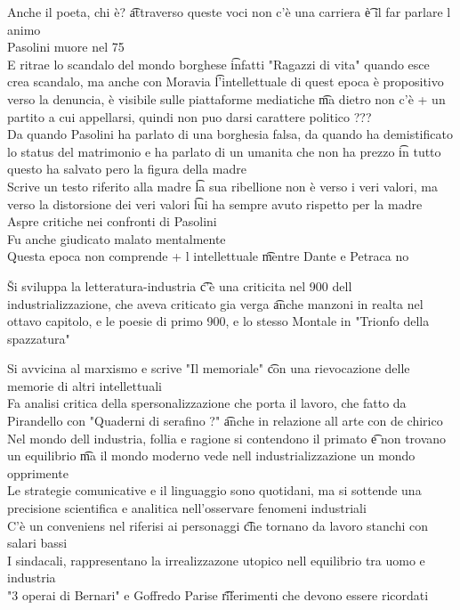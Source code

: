 \documentclass[12pt]{article}
\begin{document}
Anche il poeta, chi è? \t attraverso queste voci non c'è una carriera \t è il far parlare l animo \\
Pasolini muore nel 75 \\
E ritrae lo scandalo del mondo borghese \t infatti "Ragazzi di vita" quando esce crea scandalo, ma anche con Moravia \t l'intellettuale di quest epoca è propositivo verso la denuncia, è visibile sulle piattaforme mediatiche \t ma dietro non c'è + un partito a cui appellarsi, quindi non puo darsi carattere politico ??? \\
Da quando Pasolini ha parlato di una borghesia falsa, da quando ha demistificato lo status del matrimonio e ha parlato di un umanita che non ha prezzo \t in tutto questo ha salvato pero la figura della madre \\
Scrive un testo riferito alla madre \t la sua ribellione non è verso i veri valori, ma verso la distorsione dei veri valori \t lui ha sempre avuto rispetto per la madre \\
Aspre critiche nei confronti di Pasolini \\
Fu anche giudicato malato mentalmente \\
Questa epoca non comprende + l intellettuale \t mentre Dante e Petraca no

\v

Si sviluppa la letteratura-industria \t c'è una criticita nel 900 dell industrializzazione, che aveva criticato gia verga \t anche manzoni in realta nel ottavo capitolo, e le poesie di primo 900, e lo stesso Montale in "Trionfo della spazzatura"

Si avvicina al marxismo e scrive "Il memoriale" \t con una rievocazione delle memorie di altri intellettuali \\
Fa analisi critica della spersonalizzazione che porta il lavoro, che fatto da Pirandello con "Quaderni di serafino ?" \t anche in relazione all arte con de chirico \\
Nel mondo dell industria, follia e ragione si contendono il primato \t e non trovano un equilibrio \t ma il mondo moderno vede nell industrializzazione un mondo opprimente \\
Le strategie comunicative e il linguaggio sono quotidani, ma si sottende una precisione scientifica e analitica nell'osservare fenomeni industriali \\
C'è un conveniens nel riferisi ai personaggi \t che tornano da lavoro stanchi con salari bassi \\
I sindacali, rappresentano la irrealizzazone utopico nell equilibrio tra uomo e industria \\
"3 operai di Bernari" e Goffredo Parise \t riferimenti che devono essere ricordati
\end{document}
